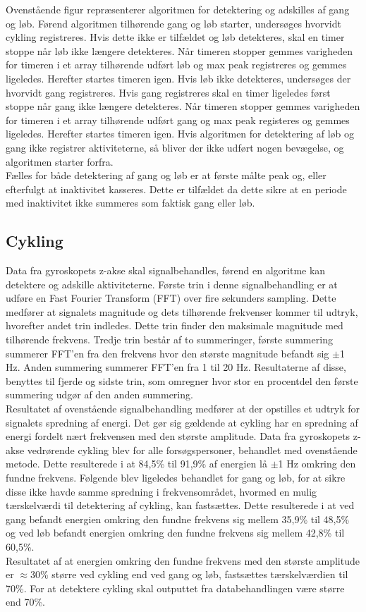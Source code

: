 Ovenstående figur repræsenterer algoritmen for detektering og adskilles af gang og løb. Førend algoritmen tilhørende gang og løb starter, undersøges hvorvidt cykling registreres. Hvis dette ikke er tilfældet og løb detekteres, skal en timer stoppe når løb ikke længere detekteres. Når timeren stopper gemmes varigheden for timeren i et array tilhørende udført løb og max peak registreres og gemmes ligeledes. Herefter startes timeren igen. Hvis løb ikke detekteres, undersøges der hvorvidt gang registreres. Hvis gang registreres skal en timer ligeledes først stoppe når gang ikke længere detekteres. Når timeren stopper gemmes varigheden for timeren i et array tilhørende udført gang og max peak registeres og gemmes ligeledes. Herefter startes timeren igen. Hvis algoritmen for detektering af løb og gang ikke registrer aktiviteterne, så bliver der ikke udført nogen bevægelse, og algoritmen starter forfra. \\
Fælles for både detektering af gang og løb er at første målte peak og, eller efterfulgt at inaktivitet kasseres. Dette er tilfældet da dette sikre at en periode med inaktivitet ikke summeres som faktisk gang eller løb. 

\subsection{Cykling}
Data fra gyroskopets z-akse skal signalbehandles, førend en algoritme kan detektere og adskille aktiviteterne. Første trin i denne signalbehandling er at udføre en Fast Fourier Transform (FFT) over fire sekunders sampling. Dette medfører at signalets magnitude og dets tilhørende frekvenser kommer til udtryk, hvorefter andet trin indledes. Dette trin finder den maksimale magnitude med tilhørende frekvens. Tredje trin består af to summeringer, første summering summerer FFT'en fra den frekvens hvor den største magnitude befandt sig $\pm$1 Hz. Anden summering summerer FFT'en fra 1 til 20 Hz. Resultaterne af disse, benyttes til fjerde og sidste trin, som omregner hvor stor en procentdel den første summering udgør af den anden summering. \\
Resultatet af ovenstående signalbehandling medfører at der opstilles et udtryk for signalets spredning af energi. Det gør sig gældende at cykling har en spredning af energi fordelt nært frekvensen med den største amplitude. Data fra gyroskopets z-akse vedrørende cykling blev for alle forsøgspersoner, behandlet med ovenstående metode. Dette resulterede i at 84,5\% til 91,9\% af energien lå $\pm$1 Hz omkring den fundne frekvens. Følgende blev ligeledes behandlet for gang og løb, for at sikre disse ikke havde samme spredning i frekvensområdet, hvormed en mulig tærskelværdi til detektering af cykling, kan fastsættes.  Dette resulterede i at ved gang befandt energien omkring den fundne frekvens sig mellem 35,9\% til 48,5\% og ved løb befandt energien omkring den fundne frekvens sig mellem 42,8\% til 60,5\%. \\
Resultatet af at energien omkring den fundne frekvens med den største amplitude er $\approx$30\% større ved cykling end ved gang og løb, fastsættes tærskelværdien til 70\%. For at detektere cykling skal outputtet fra databehandlingen være større end 70\%.

